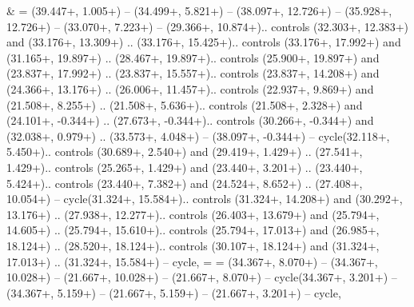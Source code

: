 {&} = {(39.447+\ctpXshift, 1.005+\ctpYshift) -- (34.499+\ctpXshift, 5.821+\ctpYshift) -- (38.097+\ctpXshift, 12.726+\ctpYshift) -- (35.928+\ctpXshift, 12.726+\ctpYshift) -- (33.070+\ctpXshift, 7.223+\ctpYshift) -- (29.366+\ctpXshift, 10.874+\ctpYshift).. controls (32.303+\ctpXshift, 12.383+\ctpYshift) and (33.176+\ctpXshift, 13.309+\ctpYshift) .. (33.176+\ctpXshift, 15.425+\ctpYshift).. controls (33.176+\ctpXshift, 17.992+\ctpYshift) and (31.165+\ctpXshift, 19.897+\ctpYshift) .. (28.467+\ctpXshift, 19.897+\ctpYshift).. controls (25.900+\ctpXshift, 19.897+\ctpYshift) and (23.837+\ctpXshift, 17.992+\ctpYshift) .. (23.837+\ctpXshift, 15.557+\ctpYshift).. controls (23.837+\ctpXshift, 14.208+\ctpYshift) and (24.366+\ctpXshift, 13.176+\ctpYshift) .. (26.006+\ctpXshift, 11.457+\ctpYshift).. controls (22.937+\ctpXshift, 9.869+\ctpYshift) and (21.508+\ctpXshift, 8.255+\ctpYshift) .. (21.508+\ctpXshift, 5.636+\ctpYshift).. controls (21.508+\ctpXshift, 2.328+\ctpYshift) and (24.101+\ctpXshift, -0.344+\ctpYshift) .. (27.673+\ctpXshift, -0.344+\ctpYshift).. controls (30.266+\ctpXshift, -0.344+\ctpYshift) and (32.038+\ctpXshift, 0.979+\ctpYshift) .. (33.573+\ctpXshift, 4.048+\ctpYshift) -- (38.097+\ctpXshift, -0.344+\ctpYshift) -- cycle(32.118+\ctpXshift, 5.450+\ctpYshift).. controls (30.689+\ctpXshift, 2.540+\ctpYshift) and (29.419+\ctpXshift, 1.429+\ctpYshift) .. (27.541+\ctpXshift, 1.429+\ctpYshift).. controls (25.265+\ctpXshift, 1.429+\ctpYshift) and (23.440+\ctpXshift, 3.201+\ctpYshift) .. (23.440+\ctpXshift, 5.424+\ctpYshift).. controls (23.440+\ctpXshift, 7.382+\ctpYshift) and (24.524+\ctpXshift, 8.652+\ctpYshift) .. (27.408+\ctpXshift, 10.054+\ctpYshift) -- cycle(31.324+\ctpXshift, 15.584+\ctpYshift).. controls (31.324+\ctpXshift, 14.208+\ctpYshift) and (30.292+\ctpXshift, 13.176+\ctpYshift) .. (27.938+\ctpXshift, 12.277+\ctpYshift).. controls (26.403+\ctpXshift, 13.679+\ctpYshift) and (25.794+\ctpXshift, 14.605+\ctpYshift) .. (25.794+\ctpXshift, 15.610+\ctpYshift).. controls (25.794+\ctpXshift, 17.013+\ctpYshift) and (26.985+\ctpXshift, 18.124+\ctpYshift) .. (28.520+\ctpXshift, 18.124+\ctpYshift).. controls (30.107+\ctpXshift, 18.124+\ctpYshift) and (31.324+\ctpXshift, 17.013+\ctpYshift) .. (31.324+\ctpXshift, 15.584+\ctpYshift) -- cycle},
{=} = {(34.367+\ctpXshift, 8.070+\ctpYshift) -- (34.367+\ctpXshift, 10.028+\ctpYshift) -- (21.667+\ctpXshift, 10.028+\ctpYshift) -- (21.667+\ctpXshift, 8.070+\ctpYshift) -- cycle(34.367+\ctpXshift, 3.201+\ctpYshift) -- (34.367+\ctpXshift, 5.159+\ctpYshift) -- (21.667+\ctpXshift, 5.159+\ctpYshift) -- (21.667+\ctpXshift, 3.201+\ctpYshift) -- cycle},
